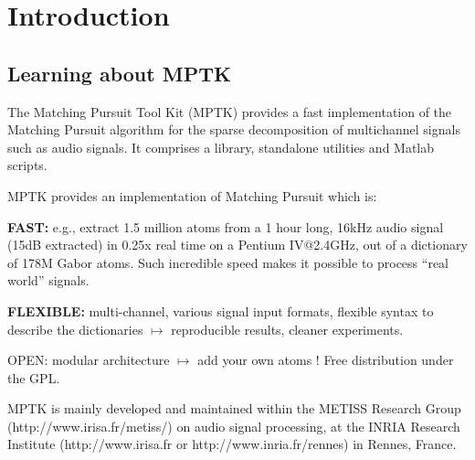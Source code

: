 \chapter{Introduction}

\section{Learning about MPTK}
	
The Matching Pursuit Tool Kit (MPTK) provides a fast implementation of the Matching Pursuit algorithm for 
the sparse decomposition of multichannel signals such as audio signals. It comprises a library, standalone 
utilities and Matlab scripts.

MPTK provides an implementation of Matching Pursuit which is: 

\begin{my_itemize}
	\item \textbf{FAST:} e.g., extract 1.5 million atoms from a 1 hour long, 16kHz audio signal (15dB extracted) in 0.25x 
	real time on a Pentium IV@2.4GHz, out of a dictionary of 178M Gabor atoms. Such incredible speed makes it 
	possible to process ``real world'' signals.
	\item \textbf{FLEXIBLE:} multi-channel, various signal input formats, flexible syntax to describe the dictionaries 
	$\mapsto$ reproducible results, cleaner experiments. 
	\item OPEN: modular architecture $\mapsto$ add your own atoms ! Free distribution under the GPL. 
\end{my_itemize}

MPTK is mainly developed and maintained within the METISS Research Group \linebreak
(http://www.irisa.fr/metiss/) on audio signal processing, at the INRIA Research 
Institute (http://www.irisa.fr or http://www.inria.fr/rennes) in Rennes, France.

